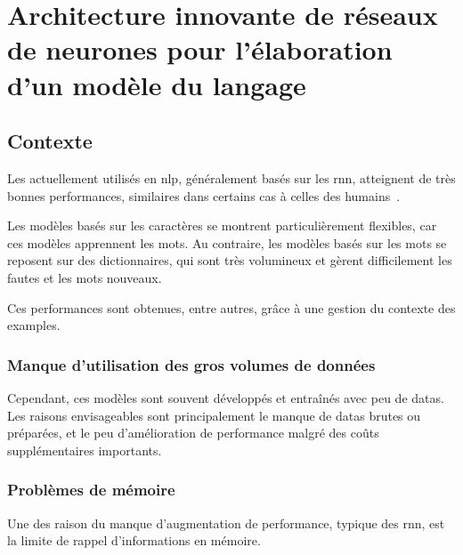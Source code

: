 
\chapter[Architecture innovante de réseaux de neurones pour un modèle du langage]{Architecture innovante de réseaux de neurones pour l'élaboration d'un modèle du langage\label{ch:project_gmsnn}}
\section{Contexte}
Les  actuellement utilisés en \gls{nlp}, généralement basés sur les \gls{rnn}, atteignent de très bonnes performances, similaires dans certains cas à celles des humains~\autocite{rnn_perf,JozefowiczVSSW16,UnreasonableRNN}.

Les modèles basés sur les caractères se montrent particulièrement flexibles, car ces modèles \og apprennent\fg{} les mots. Au contraire, les modèles basés sur les mots se reposent sur des dictionnaires, qui sont très volumineux et gèrent difficilement les fautes et les mots nouveaux.

Ces performances sont obtenues, entre autres, grâce à une gestion du contexte des \glspl{example}.

\subsection{Manque d'utilisation des gros volumes de données}
Cependant, ces modèles sont souvent développés et entraînés avec peu de \glspl{data}.
Les raisons envisageables sont principalement le manque de \glspl{data} brutes ou préparées, et le peu d'amélioration de performance malgré des coûts supplémentaires importants.

\subsection{Problèmes de mémoire}\label{subsec:mempb}
Une des raison du manque d'augmentation de performance, typique des \gls{rnn}, est la limite de rappel d'informations en mémoire. %

